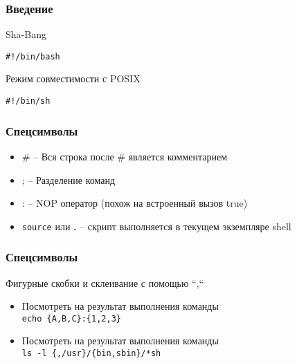 

\begin{frame}[fragile]
	\frametitle{Введение}

	\begin{block}{Sha-Bang}
		\begin{lstlisting}
#!/bin/bash
		\end{lstlisting}
	\end{block}

	\begin{block}{Режим совместимости с POSIX}
		\begin{lstlisting}
#!/bin/sh
		\end{lstlisting}

	\end{block}

\end{frame}


\begin{frame}
	\frametitle{Спецсимволы}

	\begin{itemize}
		\item \# -- Вся строка после \# является комментарием
		\item ; -- Разделение команд
		\item : -- NOP оператор (похож на встроенный вызов true)
		\item {\tt source} или {\bf .} -- скрипт выполняется в текущем экземпляре shell
	\end{itemize}

\end{frame}


\begin{frame}
	\frametitle{Спецсимволы}

	\begin{block}{Фигурные скобки и склеивание с помощью ``,``}
		\begin{itemize}
			\item Посмотреть на результат выполнения команды \\
				{\tt echo \{A,B,C\}:\{1,2,3\}}
				\pause
			\item Посмотреть на результат выполнения команды \\
				{\tt ls -l \{,/usr\}/\{bin,sbin\}/*sh}
		\end{itemize}
	\end{block}

\end{frame}


